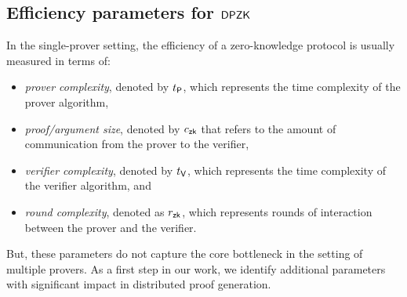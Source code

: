 \subsection{Efficiency parameters for $\mathsf{DPZK}$}\label{sec:efficiencyparams}
In the single-prover setting, the efficiency of a zero-knowledge protocol is usually measured in terms of: 
\begin{itemize}
\item {\em prover complexity}, denoted by $t_{\mathsf{P}}$, which represents the time
complexity of the prover algorithm,
\item {\em proof/argument size}, denoted by $c_\mathsf{zk}$ that refers to the amount
of communication from the prover to the verifier,
\item {\em verifier complexity}, denoted by $t_{\mathsf{V}}$, which represents the
time complexity of the verifier algorithm, and
\item {\em round complexity}, denoted as $r_\mathsf{zk}$, which represents rounds of interaction between the prover and the verifier. %
\end{itemize} 
But, these parameters do not capture the core bottleneck in the setting of multiple provers.  
As a first step in our work, we identify additional parameters with significant impact in distributed proof generation. 


